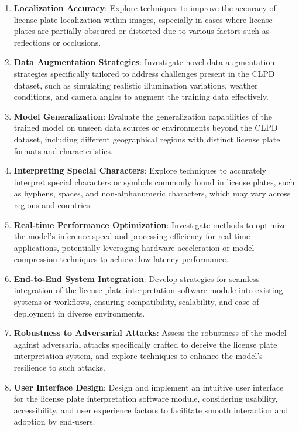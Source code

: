 	
	\begin{enumerate}
		\item \textbf{Localization Accuracy}:
		Explore techniques to improve the accuracy of license plate localization within images, especially in cases where license plates are partially obscured or distorted due to various factors such as reflections or occlusions.
		
		\item \textbf{Data Augmentation Strategies}:
		Investigate novel data augmentation strategies specifically tailored to address challenges present in the CLPD dataset, such as simulating realistic illumination variations, weather conditions, and camera angles to augment the training data effectively.
		
		\item \textbf{Model Generalization}:
		Evaluate the generalization capabilities of the trained model on unseen data sources or environments beyond the CLPD dataset, including different geographical regions with distinct license plate formats and characteristics.
		
		\item \textbf{Interpreting Special Characters}:
		Explore techniques to accurately interpret special characters or symbols commonly found in license plates, such as hyphens, spaces, and non-alphanumeric characters, which may vary across regions and countries.
		
		\item \textbf{Real-time Performance Optimization}:
		Investigate methods to optimize the model's inference speed and processing efficiency for real-time applications, potentially leveraging hardware acceleration or model compression techniques to achieve low-latency performance.
		
		\item \textbf{End-to-End System Integration}:
		Develop strategies for seamless integration of the license plate interpretation software module into existing systems or workflows, ensuring compatibility, scalability, and ease of deployment in diverse environments.
		
		\item \textbf{Robustness to Adversarial Attacks}:
		Assess the robustness of the model against adversarial attacks specifically crafted to deceive the license plate interpretation system, and explore techniques to enhance the model's resilience to such attacks.
		
		\item \textbf{User Interface Design}:
		Design and implement an intuitive user interface for the license plate interpretation software module, considering usability, accessibility, and user experience factors to facilitate smooth interaction and adoption by end-users.
		

\end{enumerate}
